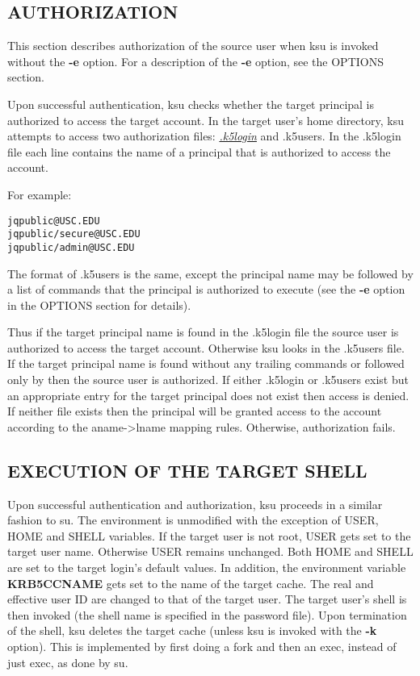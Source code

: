 \documentclass[letterpaper,10pt,english]{sphinxmanual}
\begin{document}
\subsection{AUTHORIZATION}
\label{user/user_commands/ksu:authorization}
This section describes authorization of the source user when ksu is
invoked without the \textbf{-e} option.  For a description of the \textbf{-e}
option, see the OPTIONS section.

Upon successful authentication, ksu checks whether the target
principal is authorized to access the target account.  In the target
user's home directory, ksu attempts to access two authorization files:
{\hyperref[user/user_config/k5login:k5login-5]{\emph{.k5login}}} and .k5users.  In the .k5login file each line
contains the name of a principal that is authorized to access the
account.

For example:

\begin{Verbatim}[commandchars=\\\{\}]
jqpublic@USC.EDU
jqpublic/secure@USC.EDU
jqpublic/admin@USC.EDU
\end{Verbatim}

The format of .k5users is the same, except the principal name may be
followed by a list of commands that the principal is authorized to
execute (see the \textbf{-e} option in the OPTIONS section for details).

Thus if the target principal name is found in the .k5login file the
source user is authorized to access the target account.  Otherwise ksu
looks in the .k5users file.  If the target principal name is found
without any trailing commands or followed only by \code{*} then the
source user is authorized.  If either .k5login or .k5users exist but
an appropriate entry for the target principal does not exist then
access is denied.  If neither file exists then the principal will be
granted access to the account according to the aname-\textgreater{}lname mapping
rules.  Otherwise, authorization fails.


\subsection{EXECUTION OF THE TARGET SHELL}
\label{user/user_commands/ksu:execution-of-the-target-shell}
Upon successful authentication and authorization, ksu proceeds in a
similar fashion to su.  The environment is unmodified with the
exception of USER, HOME and SHELL variables.  If the target user is
not root, USER gets set to the target user name.  Otherwise USER
remains unchanged.  Both HOME and SHELL are set to the target login's
default values.  In addition, the environment variable \textbf{KRB5CCNAME}
gets set to the name of the target cache.  The real and effective user
ID are changed to that of the target user.  The target user's shell is
then invoked (the shell name is specified in the password file).  Upon
termination of the shell, ksu deletes the target cache (unless ksu is
invoked with the \textbf{-k} option).  This is implemented by first doing a
fork and then an exec, instead of just exec, as done by su.
\end{document}
